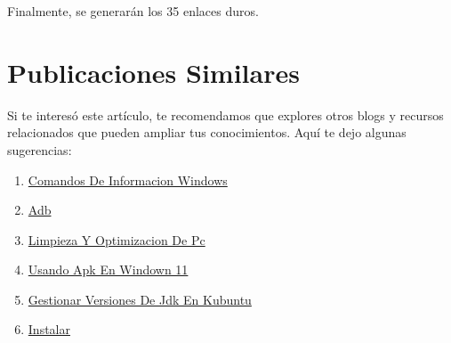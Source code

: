 \documentclass[
  jou,
  floatsintext,
  longtable,
  a4paper,
  nolmodern,
  notxfonts,
  notimes,
  colorlinks=true,linkcolor=blue,citecolor=blue,urlcolor=blue]{apa7}
\providecommand{\tightlist}{%
  \setlength{\itemsep}{0pt}\setlength{\parskip}{0pt}}
\begin{document}
Finalmente, se generarán los 35 enlaces duros.

\section{Publicaciones Similares}\label{publicaciones-similares}

Si te interesó este artículo, te recomendamos que explores otros blogs y
recursos relacionados que pueden ampliar tus conocimientos. Aquí te dejo
algunas sugerencias:

\begin{enumerate}
\def\labelenumi{\arabic{enumi}.}
\tightlist
\item
  \href{https://achalmaedison.netlify.app/tecnologia-seguridad/operating-system/2017-05-21-comandos-de-informacion-windows/index.pdf}{}
  \href{https://achalmaedison.netlify.app/tecnologia-seguridad/operating-system/2017-05-21-comandos-de-informacion-windows}{Comandos
  De Informacion Windows}
\item
  \href{https://achalmaedison.netlify.app/tecnologia-seguridad/operating-system/2019-06-19-adb/index.pdf}{}
  \href{https://achalmaedison.netlify.app/tecnologia-seguridad/operating-system/2019-06-19-adb}{Adb}
\item
  \href{https://achalmaedison.netlify.app/tecnologia-seguridad/operating-system/2021-08-17-limpieza-y-optimizacion-de-pc/index.pdf}{}
  \href{https://achalmaedison.netlify.app/tecnologia-seguridad/operating-system/2021-08-17-limpieza-y-optimizacion-de-pc}{Limpieza
  Y Optimizacion De Pc}
\item
  \href{https://achalmaedison.netlify.app/tecnologia-seguridad/operating-system/2021-10-21-usando-apk-en-windown-11/index.pdf}{}
  \href{https://achalmaedison.netlify.app/tecnologia-seguridad/operating-system/2021-10-21-usando-apk-en-windown-11}{Usando
  Apk En Windown 11}
\item
  \href{https://achalmaedison.netlify.app/tecnologia-seguridad/operating-system/2022-05-12-gestionar-versiones-de-jdk-en-kubuntu/index.pdf}{}
  \href{https://achalmaedison.netlify.app/tecnologia-seguridad/operating-system/2022-05-12-gestionar-versiones-de-jdk-en-kubuntu}{Gestionar
  Versiones De Jdk En Kubuntu}
\item
  \href{https://achalmaedison.netlify.app/tecnologia-seguridad/operating-system/2022-07-21-instalar-tor-browser/index.pdf}{}
  \href{https://achalmaedison.netlify.app/tecnologia-seguridad/operating-system/2022-07-21-instalar-tor-browser}{Instalar
}
\end{enumerate}
\end{document}

